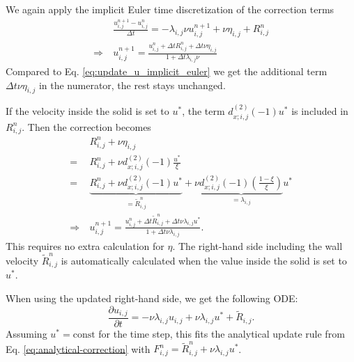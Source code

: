 \documentclass{article}
\numberwithin{equation}{section}
\newcommand{\pd}[2]{\dfrac{\partial #1}{\partial #2}}
\begin{document}
We again apply the implicit Euler time discretization of the correction terms
\begin{equation}
    \begin{split}
        &\frac{u_{i,j}^{n+1} - u_{i,j}^n}{\Delta t} =
        -\lambda_{i,j} \nu u_{i,j}^{n+1} + \nu \eta_{i,j} +  R_{i,j}^n \\
        \Rightarrow\ &
        u_{i,j}^{n+1}
        = 
        \frac{
            u_{i,j}^n
            + \Delta t R_{i,j}^n
            + \Delta t \nu \eta_{i,j}
        }{1 + \Delta t \lambda_{i,j} \nu}
    \end{split}
\end{equation}
Compared to Eq. \eqref{eq:update_u_implicit_euler} we get the additional term $\Delta t \nu \eta_{i,j}$ in the numerator, the rest stays unchanged.

If the velocity inside the solid is set to $u^*$, the term $d^{(2)}_{x;i,j}(-1) u^*$ is included in $R_{i,j}^n$.
Then the correction becomes
\begin{equation}
    \begin{split}
        &R_{i,j}^n + \nu \eta_{i,j} \\
        =\ &R_{i,j}^n + \nu d^{(2)}_{x;i,j}(-1) \frac{u^*}{\xi} \\
        =\ &\underbrace{R_{i,j}^n + \nu d^{(2)}_{x;i,j}(-1) u^*}_{= \tilde{R}_{i,j}^n}
        + \nu \underbrace{d^{(2)}_{x;i,j}(-1) \left(\frac{1 - \xi}{\xi}\right)}_{=\lambda_{i,j}} u^* \\
        \Rightarrow \ &u_{i,j}^{n+1}
        = 
        \frac{
            u_{i,j}^n
            + \Delta t \tilde{R}_{i,j}^n
            + \Delta t \nu \lambda_{i,j} u^*
        }{1 + \Delta t \nu \lambda_{i,j}}.
    \end{split}
\end{equation}
This requires no extra calculation for $\eta$.
The right-hand side including the wall velocity $\tilde{R}_{i,j}^n$ is automatically calculated when the value inside the solid is set to $u^*$.

When using the updated right-hand side, we get the following ODE:
\begin{equation}
    \pd{u_{i,j}}{t}
    = -\nu \lambda_{i,j} u_{i,j} + \nu \lambda_{i,j} u^* +  \tilde{R}_{i,j}.
\end{equation}
Assuming $u^* = \text{const}$ for the time step,
this fits the analytical update rule from Eq. \eqref{eq:analytical-correction} with $F_{i,j}^n = \tilde{R}_{i,j}^n + \nu \lambda_{i,j} u^*$.
\end{document}
